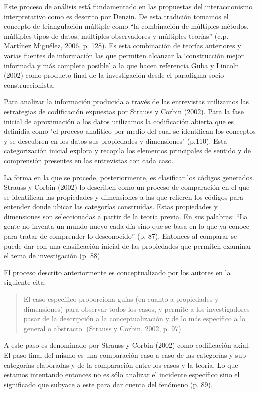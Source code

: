 Este proceso de análisis está fundamentado en las propuestas del interaccionismo
interpretativo como es descrito por Denzin.
De esta tradición tomamos el concepto de triangulación múltiple como “la
combinación de múltiples métodos, múltiples tipos de datos, múltiples
observadores y múltiples teorías” (c.p. Martínez Miguélez, 2006, p. 128).
Es esta combinación de teorías anteriores y varias fuentes de información las
que permiten alcanzar la ‘construcción mejor informada y más completa
posible’ a la que hacen referencia Guba y Lincoln (2002) como producto final de
la investigación desde el paradigma socio-construccionista.

Para analizar la información producida a través de las entrevistas utilizamos
las estrategias de codificación expuestas por Strauss y Corbin (2002).
Para la fase inicial de aproximación a los datos utilizamos la codificación
abierta que es definidia como "el proceso analítico por medio del cual se
identifican los conceptos y se descubren en los datos sus propiedades y
dimensiones" (p.110).
Esta categorización inicial explora y recopila los elementos principales
de sentido y de comprensión presentes en las entrevistas con cada caso.

La forma en la que se procede, posteriormente, es clasificar los códigos
generados. Strauss y Corbin (2002) lo describen como un proceso de
comparación en el que se identifican las propiedades y dimensiones a las que
refieren los códigos para entender donde ubicar las categorías construídas.
Estas propiedades y dimensiones son seleccionadas a partir de la teoría previa.
En sus palabras: “La gente no inventa un mundo nuevo cada día sino que se
basa en lo que ya conoce para tratar de comprender lo desconocido” (p. 87).
Entonces al comparar se puede dar con una clasificación inicial de las
propiedades que permiten examinar el tema de investigación (p. 88).

El proceso descrito anteriormente es conceptualizado por los autores en la
siguiente cita:

\begin{quote}
    El caso específico proporciona guías (en cuanto a propiedades y
    dimensiones) para observar todos los casos, y permite a los
    investigadores pasar de la descripción a la conceptualización y de lo más
    específico a lo general o abstracto. (Strauss y Corbin, 2002, p. 97)
\end{quote}

A este paso es denominado por Strauss y Corbin (2002) como codificación axial.
El paso final del mismo es una comparación caso a caso de las categorías y
sub-categorías elaboradas y de la comparación entre los casos y la teoría.
Lo que estamos intentando entonces no es sólo analizar el incidente
específico sino el significado que subyace a este para dar cuenta del
fenómeno (p. 89).


